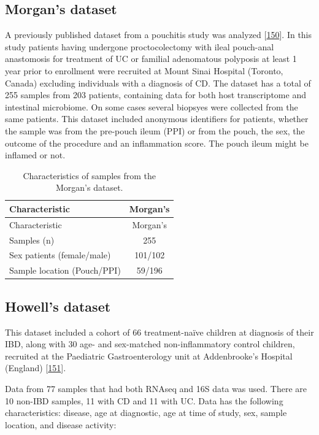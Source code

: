 \documentclass[
  12pt,
  a4paper,
  twoside,
  openright]{book}
\begin{document}
\hypertarget{methods-morgan}{%
\subsection{Morgan's dataset}\label{methods-morgan}}

A previously published dataset from a pouchitis study was analyzed {[}\protect\hyperlink{ref-morgan2015}{150}{]}.
In this study patients having undergone proctocolectomy with ileal pouch-anal anastomosis for treatment of UC or familial adenomatous polyposis at least 1 year prior to enrollment were recruited at Mount Sinai Hospital (Toronto, Canada) excluding individuals with a diagnosis of CD.
The dataset has a total of 255 samples from 203 patients, containing data for both host transcriptome and intestinal microbiome.
On some cases several biopsyes were collected from the same patients.
This dataset included anonymous identifiers for patients, whether the sample was from the pre-pouch ileum (PPI) or from the pouch, the sex, the outcome of the procedure and an inflammation score.
The pouch ileum might be inflamed or not.

\begin{longtable}[]{@{}lc@{}}
\caption{\label{tab:Morgan} Characteristics of samples from the Morgan's dataset.}\tabularnewline
\toprule
Characteristic & Morgan's \\
\midrule
\endfirsthead
\toprule
Characteristic & Morgan's \\
\midrule
\endhead
Samples (n) & 255 \\
Sex patients (female/male) & 101/102 \\
Sample location (Pouch/PPI) & 59/196 \\
\bottomrule
\end{longtable}

\hypertarget{methods-howell}{%
\subsection{Howell's dataset}\label{methods-howell}}

This dataset included a cohort of 66 treatment-naïve children at diagnosis of their IBD, along with 30 age- and sex-matched non-inflammatory control children, recruited at the Paediatric Gastroenterology unit at Addenbrooke's Hospital (England) {[}\protect\hyperlink{ref-howell2018}{151}{]}.

Data from 77 samples that had both RNAseq and 16S data was used.
There are 10 non-IBD samples, 11 with CD and 11 with UC.
Data has the following characteristics: disease, age at diagnostic, age at time of study, sex, sample location, and disease activity:
\end{document}
